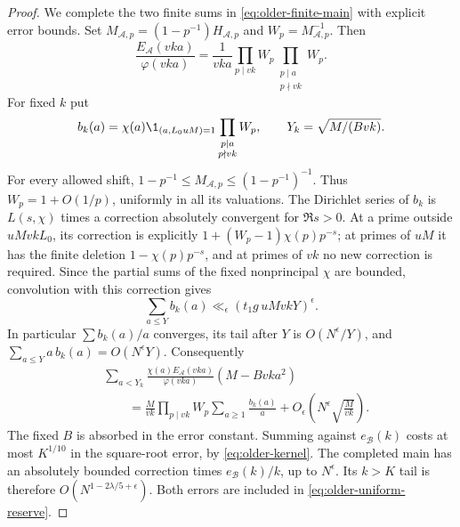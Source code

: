 \begin{proof}
We complete the two finite sums in
\eqref{eq:older-finite-main} with explicit error bounds.
Set \(M_{\mathcal A,p}=(1-p^{-1})H_{\mathcal A,p}\) and
\(W_p=M_{\mathcal A,p}^{-1}\).
Then
\[
 \frac{E_{\mathcal A}(vka)}{\varphi(vka)}
   =\frac1{vka}\prod_{p\mid vk}W_p
                    \prod_{\substack{p\mid a\\p\nmid vk}}W_p.
\]
For fixed \(k\) put
\[
 b_k(a)=\chi(a)\1_{(a,L_0uM)=1}
                       \prod_{\substack{p\mid a\\p\nmid vk}}W_p,
 \qquad Y_k=\sqrt{M/(Bvk)}.
\]
For every allowed shift,
\(1-p^{-1}\le M_{\mathcal A,p}\le(1-p^{-1})^{-1}\).
Thus \(W_p=1+O(1/p)\), uniformly in all its valuations.
The Dirichlet series of \(b_k\) is \(L(s,\chi)\) times a correction
absolutely convergent for \(\Re s>0\).
At a prime outside \(uMvkL_0\), its correction is explicitly
\(1+(W_p-1)\chi(p)p^{-s}\); at primes of \(uM\) it has the finite
deletion \(1-\chi(p)p^{-s}\), and at primes of \(vk\) no new
correction is required.
Since the partial sums of the fixed nonprincipal \(\chi\) are
bounded, convolution with this correction gives
\[
 \sum_{a\le Y}b_k(a)\ll_\epsilon
                 (t_1g\,uMvkY)^\epsilon .
\]
In particular \(\sum b_k(a)/a\) converges, its tail after \(Y\)
is \(O(N^\epsilon/Y)\), and
\(\sum_{a\le Y}a\,b_k(a)=O(N^\epsilon Y)\).
Consequently
\[
 \begin{split}
 &\sum_{a<Y_k}
 \frac{\chi(a)E_{\mathcal A}(vka)}{\varphi(vka)}
                                      (M-Bvka^2)\\
 &\qquad=
 \frac{M}{vk}\prod_{p\mid vk}W_p
                       \sum_{a\ge1}\frac{b_k(a)}a
        +O_\epsilon\!\left(N^\epsilon\sqrt{\frac{M}{vk}}\right).
 \end{split}
\]
The fixed \(B\) is absorbed in the error constant.
Summing against \(e_{\mathcal B}(k)\) costs at most \(K^{1/10}\)
in the square-root error, by \eqref{eq:older-kernel}.
The completed main has an absolutely bounded correction times
\(e_{\mathcal B}(k)/k\), up to \(N^\epsilon\).
Its \(k>K\) tail is therefore
\(O(N^{1-2\lambda/5+\epsilon})\).
Both errors are included in \eqref{eq:older-uniform-reserve}.


\end{proof}
